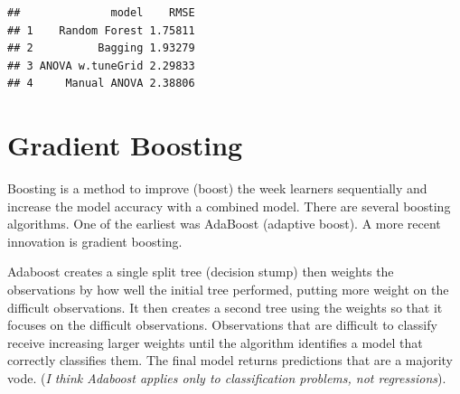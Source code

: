 \documentclass[]{book}
\newenvironment{Shaded}{\begin{snugshade}}{\end{snugshade}}
\newcommand{\DataTypeTok}[1]{\textcolor[rgb]{0.13,0.29,0.53}{#1}}
\newcommand{\DecValTok}[1]{\textcolor[rgb]{0.00,0.00,0.81}{#1}}
\newcommand{\KeywordTok}[1]{\textcolor[rgb]{0.13,0.29,0.53}{\textbf{#1}}}
\newcommand{\NormalTok}[1]{#1}
\newcommand{\OperatorTok}[1]{\textcolor[rgb]{0.81,0.36,0.00}{\textbf{#1}}}
\newcommand{\StringTok}[1]{\textcolor[rgb]{0.31,0.60,0.02}{#1}}
\begin{document}
\begin{Shaded}
\end{Shaded}

\begin{verbatim}
##              model    RMSE
## 1    Random Forest 1.75811
## 2          Bagging 1.93279
## 3 ANOVA w.tuneGrid 2.29833
## 4     Manual ANOVA 2.38806
\end{verbatim}

\hypertarget{gradient-boosting}{%
\section{Gradient Boosting}\label{gradient-boosting}}

Boosting is a method to improve (boost) the week learners sequentially and increase the model accuracy with a combined model. There are several boosting algorithms. One of the earliest was AdaBoost (adaptive boost). A more recent innovation is gradient boosting.

Adaboost creates a single split tree (decision stump) then weights the observations by how well the initial tree performed, putting more weight on the difficult observations. It then creates a second tree using the weights so that it focuses on the difficult observations. Observations that are difficult to classify receive increasing larger weights until the algorithm identifies a model that correctly classifies them. The final model returns predictions that are a majority vode. (\emph{I think Adaboost applies only to classification problems, not regressions}).
\end{document}
